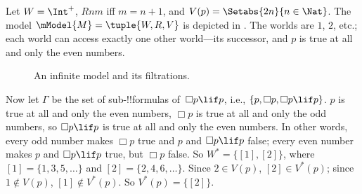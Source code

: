 \documentclass[../../../include/open-logic-section]{subfiles}
\begin{document}
\begin{ex}
  Let $W = \Int^+$, $Rnm$ iff $m = n + 1$, and $V(p) = \Setabs{2n}{n \in
    \Nat}$. The model $\mModel{M} = \tuple{W, R, V}$ is depicted in
  . The worlds are $1$, $2$, etc.; each
  world can access exactly one other world---its successor, and $p$ is
  true at all and only the even numbers.

  \begin{figure}
    \centering

    \caption{An infinite model and its filtrations.}
  \end{figure}
  
  Now let $\Gamma$ be the set of sub-!!{formula}s of~$\Box p \lif p$,
  i.e., $\{p, \Box p, \Box p \lif p\}$. $p$ is true at all and only
  the even numbers, $\Box p$ is true at all and only the odd numbers,
  so $\Box p \lif p$ is true at all and only the even numbers. In
  other words, every odd number makes $\Box p$ true and $p$ and $\Box
  p \lif p$ false; every even number makes $p$ and $\Box p \lif p$
  true, but $\Box p$ false. So $W^* = \{ [1], [2] \}$, where $[1] =
  \{1, 3, 5, \dots\}$ and $[2] = \{2, 4, 6, \dots\}$. Since $2 \in
  V(p)$, $[2] \in V^*(p)$; since $1 \notin V(p)$, $[1] \notin
  V^*(p)$. So $V^*(p) = \{[2]\}$.


\end{ex}
\end{document}
